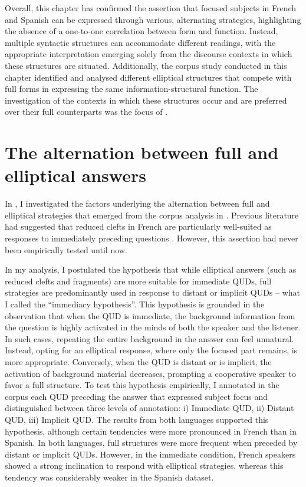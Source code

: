 \hspace*{-3pt}Overall, this chapter has confirmed the assertion that focused subjects in French and Spanish can be expressed through various, alternating strategies, highlighting the absence of a one-to-one correlation between form and function. Instead, multiple syntactic structures can accommodate different readings, with the appropriate interpretation emerging solely from the discourse contexts in which these structures are situated. Additionally, the corpus study conducted in this chapter identified and analysed different elliptical structures that compete with full forms in expressing the same information-structural function. The investigation of the contexts in which these structures occur and are preferred over their full counterparts was the focus of .


\section{The alternation between full and elliptical answers}  \label{sub:8.2} %


In , I investigated the factors underlying the alternation between full and elliptical strategies that emerged from the corpus analysis in . Previous literature had suggested that reduced clefts in French are particularly well-suited as responses to immediately preceding questions \parencite{belletti2008answering, katz2000categories}. However, this assertion had never been empirically tested until now.

In my analysis, I postulated the hypothesis that while elliptical answers (such as reduced clefts and fragments) are more suitable for immediate QUDs, full strategies are predominantly used in response to distant or implicit QUDs -- what I called the ``immediacy hypothesis”. This hypothesis is grounded in the observation that when the QUD is immediate, the background information from the question is highly activated in the minds of both the speaker and the listener. In such cases, repeating the entire background in the answer can feel unnatural. Instead, opting for an elliptical response, where only the focused part remains, is more appropriate. Conversely, when the QUD is distant or is implicit, the activation of background material decreases, prompting a cooperative speaker to favor a full structure.
To test this hypothesis empirically, I annotated in the corpus each QUD preceding the answer that expressed subject focus and distinguished between three levels of annotation: i) Immediate QUD, ii) Distant QUD, iii) Implicit QUD. The results from both languages supported this hypothesis, although certain tendencies were more pronounced in French than in Spanish. In both languages, full structures were more frequent when preceded by distant or implicit QUDs. However, in the immediate condition, French speakers showed a strong inclination to respond with elliptical strategies, whereas this tendency was considerably weaker in the Spanish dataset.

